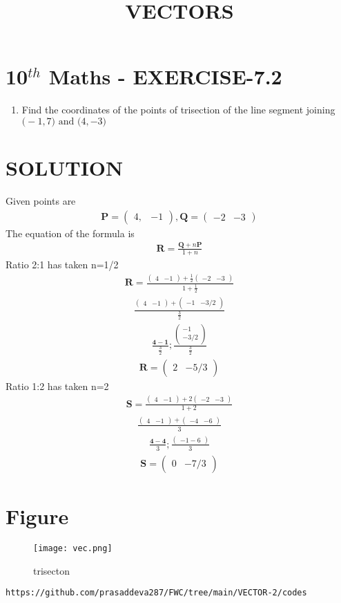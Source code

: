 \documentclass[12pt]{article}
\newcommand{\myvec}[1]{\ensuremath{\begin{pmatrix}#1\end{pmatrix}}}
\let\vec\mathbf
\begin{document}
\begin{center}
\title{\textbf{VECTORS}}
\date{\vspace{-5ex}} %
\maketitle
\end{center}

\section{10$^{th}$ Maths - EXERCISE-7.2}

\begin{enumerate}
\item Find the coordinates of the points of trisection of the line segment joining $\vec(-1, 7) \text{ and } \vec(4, -3)$ 
\end{enumerate}

\section{SOLUTION}
Given points are
\begin{align}
\vec{P}=\myvec{4,& -1} ,
\vec{Q}=\myvec{-2& -3}
\end{align}
The equation of the formula is
\begin{align}
\vec{R}=\frac{\vec{Q}+n\vec{P}}{1+n}
\end{align}
Ratio 2:1 has taken
n=1/2 
\begin{align}
\vec{R}=\frac{\myvec{4&-1}+\frac{1}{2}\myvec{-2&-3}}{1+\frac{1}{2}}
\end{align}
\begin{align}
\frac{\myvec{4&-1}+\myvec{-1&-3/2}}{\frac{3}{2}}
\end{align}
\begin{align}
\frac{\vec{4-1}}{\frac{3}{2}};\frac{\myvec{-1\\ -3/2}}{\frac{3}{2}}
\end{align}
\begin{align}
\vec{R}=\myvec{2 & -5/3}
\end{align}
Ratio 1:2 has taken
n=2
\begin{align}
\vec{S}=\frac{\myvec{4& -1}+2\myvec{-2& -3}}{1+2}
\end{align}
\begin{align}
\frac{\myvec{4& -1}+\myvec{-4& -6}}{3}
\end{align}
\begin{align}
\frac{\vec{4-4}}{3};\frac{\myvec{-1-6}}{3}
\end{align}
\begin{align}
\vec{S}=\myvec{0& -7/3}
\end{align}

\section{Figure}
\begin{figure}[h]
\texttt{[image: vec.png]}
\caption{trisecton}
		\label{fig:Figure}
\end{figure}
\begin{lstlisting}
https://github.com/prasaddeva287/FWC/tree/main/VECTOR-2/codes
\end{lstlisting}
\end{document}
